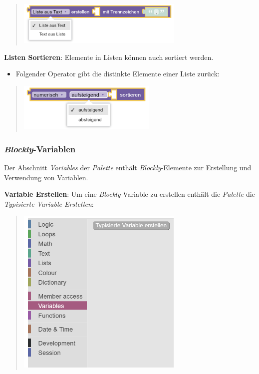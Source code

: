 \documentclass[
  letterpaper,
  DIV=11]{scrreprt}
\providecommand{\tightlist}{%
  \setlength{\itemsep}{0pt}\setlength{\parskip}{0pt}}\usepackage{longtable,booktabs,array}
\begin{document}
\begin{tcolorbox}
\begin{quote}
\includegraphics[width=3.125in,height=\textheight]{img/screenshot-blockly-element-list-to-text-or-text-to-list-element-01-DEU.png}
\end{quote}

\textbf{Listen Sortieren}: Elemente in Listen können auch sortiert
werden.

\begin{itemize}
\tightlist
\item
  Folgender Operator gibt die distinkte Elemente einer Liste zurück:
\end{itemize}

\begin{quote}
\includegraphics[width=2.60417in,height=\textheight]{img/screenshot-blockly-element-list-sort-01-DEU.png}
\end{quote}

\hypertarget{blockly-variablen-1}{%
\subsubsection{\texorpdfstring{\emph{Blockly}-Variablen}{Blockly-Variablen}}\label{blockly-variablen-1}}

Der Abschnitt \emph{Variables} der \emph{Palette} enthält
\emph{Blockly}-Elemente zur Erstellung und Verwendung von Variablen.

\textbf{Variable Erstellen}: Um eine \emph{Blockly}-Variable zu
erstellen enthält die \emph{Palette} die \emph{Typisierte Variable
Erstellen}:

\begin{quote}
\includegraphics[width=3.125in,height=\textheight]{img/screenshot-variables-palette-create-variable-01-DEU.png}
\end{quote}


\end{tcolorbox}
\end{document}
